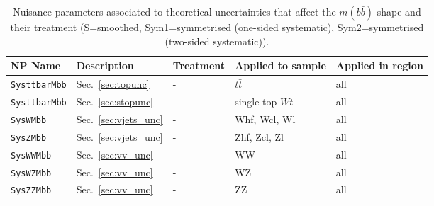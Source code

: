 \begin{table}[ht]
    \centering
    \scriptsize
    \begin{tabular}{|p{3.5cm}|p{2.5cm}|p{1.5cm}|p{2cm}|p{1.5cm}|}
        \hline
        \hline
        NP Name & Description & Treatment & Applied to sample & Applied in region \\
        \hline
        \hline
        \hline
        \texttt{SysttbarMbb} & Sec.~\ref{sec:topunc} & - & $t\bar{t}$ & all \\
        \texttt{SysttbarMbb} & Sec.~\ref{sec:stopunc} & - & single-top $Wt$ & all \\
        \texttt{SysWMbb} & Sec.~\ref{sec:vjets_unc} & - & Whf, Wcl, Wl & all \\
        \texttt{SysZMbb} & Sec.~\ref{sec:vjets_unc} & - & Zhf, Zcl, Zl & all \\
        \texttt{SysWWMbb} & Sec.~\ref{sec:vv_unc} & - & WW & all \\
        \texttt{SysWZMbb} & Sec.~\ref{sec:vv_unc} & - & WZ & all \\
        \texttt{SysZZMbb} & Sec.~\ref{sec:vv_unc} & - & ZZ & all \\
        \hline
        \hline
    \end{tabular}
    \caption{Nuisance parameters associated to theoretical uncertainties that affect the $m(b\bar{b})$ shape and their treatment (S=smoothed, Sym1=symmetrised (one-sided systematic), Sym2=symmetrised (two-sided systematic)).}
    \label{tab:np-shape}
\end{table}

